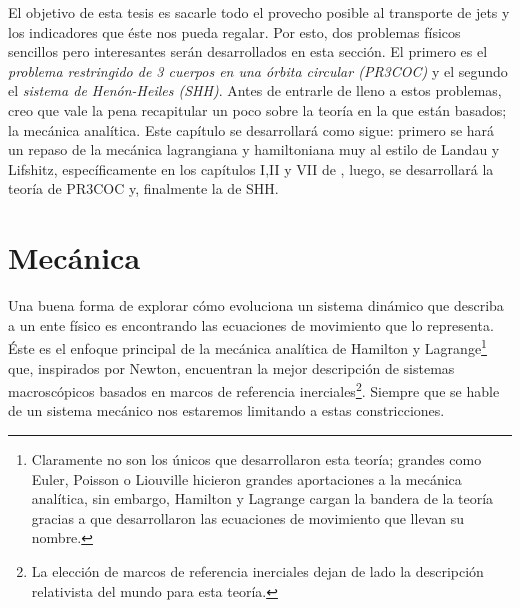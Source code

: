 
El objetivo de esta tesis es sacarle todo el provecho posible al transporte de jets y los indicadores que éste nos pueda regalar. Por esto, dos problemas físicos sencillos pero interesantes serán desarrollados en esta sección. El primero es el \textit{problema restringido de 3 cuerpos en una órbita circular (PR3COC)} y el segundo el \textit{sistema de Henón-Heiles (SHH)}. Antes de entrarle de lleno a estos problemas, creo que vale la pena recapitular un poco sobre la teoría en la que están basados; la mecánica analítica. Este capítulo se desarrollará como sigue: primero se hará un repaso de la mecánica lagrangiana y hamiltoniana muy al estilo de Landau y Lifshitz, específicamente en los capítulos I,II y VII de \cite{mechanics_landau_lifshitz}, luego, se desarrollará la teoría de PR3COC y, finalmente la de SHH.

\section{Mecánica}
\label{sec:mecanica}

Una buena forma de explorar cómo evoluciona un sistema dinámico que describa a un ente físico es encontrando las ecuaciones de movimiento que lo representa. Éste es el enfoque principal de la mecánica analítica de Hamilton y Lagrange\footnote{Claramente no son los únicos que desarrollaron esta teoría; grandes como Euler, Poisson o Liouville hicieron grandes aportaciones a la mecánica analítica, sin embargo, Hamilton y Lagrange cargan la bandera de la teoría gracias a que desarrollaron las ecuaciones de movimiento que llevan su nombre.} que, inspirados por Newton, encuentran la mejor descripción de sistemas macroscópicos basados en marcos de referencia inerciales\footnote{La elección de marcos de referencia inerciales dejan de lado la descripción relativista del mundo para esta teoría.}. Siempre que se hable de un sistema mecánico nos estaremos limitando a estas constricciones. 

